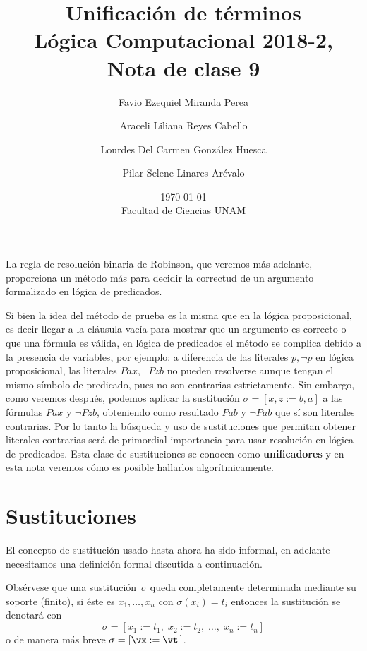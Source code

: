 \documentclass[11pt,letterpaper]{article}
\title{Unificaci\'on de t\'erminos \\
L\'ogica Computacional 2018-2, Nota de clase 9}
\author{Favio Ezequiel Miranda Perea\and Araceli Liliana Reyes Cabello\and
Lourdes Del Carmen Gonz\'alez Huesca \and Pilar Selene Linares Ar\'evalo}
\date{\today\\ Facultad de Ciencias UNAM}
\begin{document}
\maketitle
La regla de resolución binaria de Robinson, que veremos más adelante, 
proporciona un método más para decidir la correctud de un argumento formalizado 
en lógica de predicados. 

Si bien la idea del método de prueba es la misma que en la lógica 
proposicional, es decir llegar a la cláusula vacía para mostrar que un argumento 
es correcto o que una fórmula es válida, en lógica de predicados el método se 
complica debido a la presencia de variables, por ejemplo: a diferencia de las 
literales $p,\neg p$ en lógica proposicional, las literales $Pax, \neg Pzb$ no 
pueden resolverse aunque tengan el mismo símbolo de predicado, pues no son 
contrarias estrictamente. 
Sin embargo, como veremos después,  podemos aplicar la sustitución $\sigma=[x,z:=b,a]$ a las fórmulas $ Pax$ y $\neg Pzb$, 
obteniendo como resultado $Pab$ y $\neg Pab$ que sí son literales contrarias. 
Por lo tanto la búsqueda y uso de sustituciones que permitan obtener literales 
contrarias será de primordial importancia para usar resolución en lógica de 
predicados. Esta clase de sustituciones se conocen como \textbf{unificadores} y 
en esta nota veremos c\'omo es posible hallarlos algorítmicamente.


\section{Sustituciones}

El concepto de sustitución usado hasta ahora ha sido informal, en adelante 
necesitamos una definición formal discutida a continuación.

Obsérvese que una sustitución~$\sigma$ queda completamente determinada mediante 
su soporte (finito), si éste es $x_1,\ldots,x_n$ con $\sigma(x_i)=t_i$ entonces
la sustitución se denotará con
$$ \sigma = [x_1:= t_1,\;x_2:=t_2,\;\ldots,\;x_n:=t_n] $$
o de manera más breve $\sigma=[\vx:=\vt\,]$. \\
\end{document}
